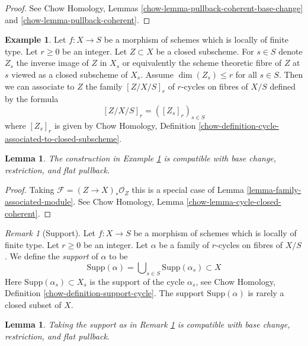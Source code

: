 \documentclass{stacks-project}
\theoremstyle{plain}
\newtheorem{lemma}[subsection]{Lemma}
\theoremstyle{definition}
\newtheorem{example}[subsection]{Example}
\theoremstyle{remark}
\newtheorem{remark}[subsection]{Remark}
\numberwithin{equation}{subsection}
\begin{document}
\begin{proof}
See Chow Homology, Lemmas
\ref{chow-lemma-pullback-coherent-base-change} and
\ref{chow-lemma-pullback-coherent}.
\end{proof}

\begin{example}
\label{example-family-associated-closed}
Let $f : X \to S$ be a morphism of schemes which is locally of finite type.
Let $r \geq 0$ be an integer. Let $Z \subset X$ be a closed subscheme.
For $s \in S$ denote $Z_s$ the inverse image of $Z$ in $X_s$
or equivalently the scheme theoretic fibre of $Z$ at $s$ viewed
as a closed subscheme of $X_s$.
Assume $\dim(Z_s) \leq r$ for all $s \in S$.
Then we can associate to $Z$ the family $[Z/X/S]_r$
of $r$-cycles on fibres of $X/S$ defined by the formula
$$
[Z/X/S]_r = ([Z_s]_r)_{s \in S}
$$
where $[Z_s]_r$ is given by
Chow Homology, Definition
\ref{chow-definition-cycle-associated-to-closed-subscheme}.
\end{example}

\begin{lemma}
\label{lemma-family-associated-closed}
The construction in Example \ref{example-family-associated-closed}
is compatible with base change, restriction, and flat pullback.
\end{lemma}

\begin{proof}
Taking $\mathcal{F} = (Z \to X)_*\mathcal{O}_Z$ this is a special case of
Lemma \ref{lemma-family-associated-module}. See
Chow Homology, Lemma \ref{chow-lemma-cycle-closed-coherent}.
\end{proof}

\begin{remark}[Support]
\label{remark-supports-family}
Let $f : X \to S$ be a morphism of schemes which is locally of finite type.
Let $r \geq 0$ be an integer. Let $\alpha$ be a family of $r$-cycles
on fibres of $X/S$. We define the {\it support} of $\alpha$ to be
$$
\text{Supp}(\alpha) =
\bigcup\nolimits_{s \in S} \text{Supp}(\alpha_s) \subset X
$$
Here $\text{Supp}(\alpha_s) \subset X_s$ is the
support of the cycle $\alpha_s$, see
Chow Homology, Definition \ref{chow-definition-support-cycle}.
The support $\text{Supp}(\alpha)$ is rarely a closed subset of $X$.
\end{remark}

\begin{lemma}
\label{lemma-support-family}
Taking the support as in Remark \ref{remark-supports-family}
is compatible with base change, restriction, and flat pullback.
\end{lemma}
\end{document}
